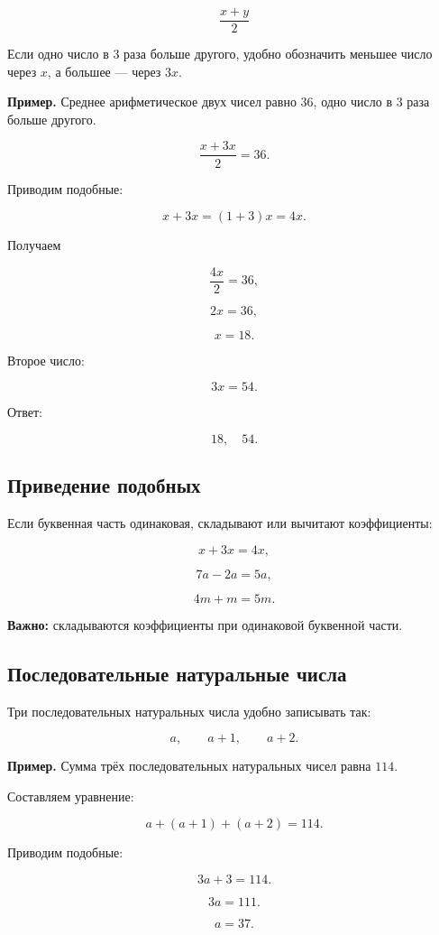 \documentclass[a4paper,12pt]{article}
\newcommand{\key}[1]{\textbf{\color{darkaccent}#1}}
\begin{document}
\[
\boxed{
\frac{x+y}{2}
}
\]

Если одно число в $3$ раза больше другого,
удобно обозначить меньшее число через $x$,
а большее --- через $3x$.

\textbf{Пример.}
Среднее арифметическое двух чисел равно $36$,
одно число в $3$ раза больше другого.

\[
\frac{x+3x}{2}=36.
\]

Приводим подобные:

\[
x+3x=(1+3)x=4x.
\]

Получаем

\[
\frac{4x}{2}=36,
\]

\[
2x=36,
\]

\[
x=18.
\]

Второе число:

\[
3x=54.
\]

Ответ:

\[
18,\quad 54.
\]

\subsection*{Приведение подобных}

Если буквенная часть одинаковая,
складывают или вычитают коэффициенты:

\[
x+3x=4x,
\]

\[
7a-2a=5a,
\]

\[
4m+m=5m.
\]

\key{Важно:}
складываются коэффициенты при одинаковой буквенной части.


\subsection*{Последовательные натуральные числа}

Три последовательных натуральных числа удобно записывать так:

\[
a,\qquad a+1,\qquad a+2.
\]

\textbf{Пример.}
Сумма трёх последовательных натуральных чисел равна $114$.

Составляем уравнение:

\[
a+(a+1)+(a+2)=114.
\]

Приводим подобные:

\[
3a+3=114.
\]

\[
3a=111.
\]

\[
a=37.
\]
\end{document}
